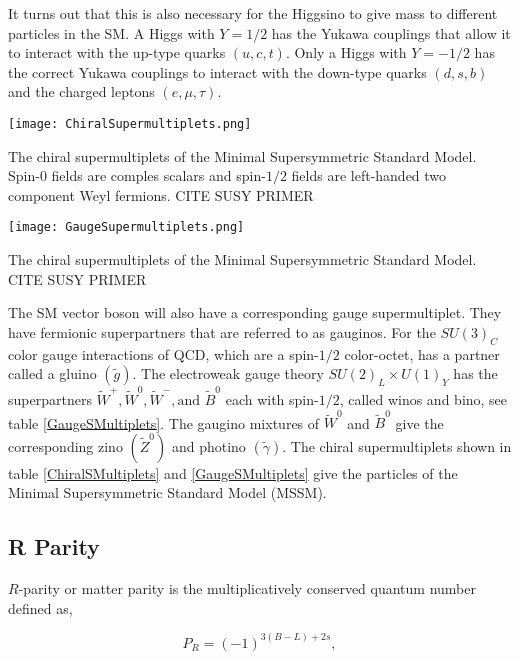 It turns out that this is also necessary for the Higgsino to give mass to different particles in the SM. A Higgs with $Y=1/2$ has the Yukawa couplings that allow it to interact with the up-type quarks $(u, c, t)$. Only a Higgs with $Y=-1/2$ has the correct Yukawa couplings to interact with the down-type quarks $(d, s, b)$ and the charged leptons $(e, \mu, \tau)$.

\begin{table}
 	\centering
	\texttt{[image: ChiralSupermultiplets.png]}
 	\caption{The chiral supermultiplets of the Minimal Supersymmetric Standard Model. Spin-0 fields are comples scalars and spin-$1/2$ fields are left-handed two component Weyl fermions. CITE SUSY PRIMER}
 	\label{ChiralSMultiplets} 
\end{table}

\begin{table}
 	\centering
	\texttt{[image: GaugeSupermultiplets.png]}
 	\caption{The chiral supermultiplets of the Minimal Supersymmetric Standard Model. CITE SUSY PRIMER}
 	\label{GaugeSMultiplets} 
\end{table}

The SM vector boson will also have a corresponding gauge supermultiplet. They have fermionic superpartners that are referred to as gauginos. For the $SU(3)_C$ color gauge interactions of QCD, which are a spin-$1/2$ color-octet, has a partner called a gluino $(\widetilde{g})$. The electroweak gauge theory $SU(2)_L\times U(1)_Y$ has the superpartners $\widetilde{W}^+,\widetilde{W}^0, \widetilde{W}^-, \text{and } \widetilde{B}^0$ each with spin-$1/2$, called winos and bino, see table \ref{GaugeSMultiplets}. The gaugino mixtures of $\widetilde{W}^0$ and $\widetilde{B}^0$ give the corresponding zino $(\widetilde{Z}^0)$ and photino $(\widetilde{\gamma})$. The chiral supermultiplets shown in table \ref{ChiralSMultiplets} and \ref{GaugeSMultiplets} give the particles of the Minimal Supersymmetric Standard Model (MSSM). 

\subsection{R Parity}
\label{subsec:rparity}

$R$-parity or matter parity is the multiplicatively conserved quantum number defined as, 

\begin{equation} \label{RParity}
P_R=(-1)^{3(B-L)+2s}, 
\end{equation}


